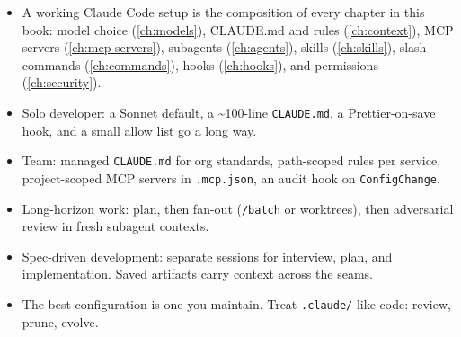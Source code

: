 \begin{summarybox}
\begin{itemize}
  \item A working Claude Code setup is the composition of every chapter
        in this book: model choice (\cref{ch:models}), CLAUDE.md and
        rules (\cref{ch:context}), MCP servers (\cref{ch:mcp-servers}),
        subagents (\cref{ch:agents}), skills (\cref{ch:skills}), slash
        commands (\cref{ch:commands}), hooks (\cref{ch:hooks}), and
        permissions (\cref{ch:security}).
  \item Solo developer: a Sonnet default, a \textasciitilde100-line
        \texttt{CLAUDE.md}, a Prettier-on-save hook, and a small allow
        list go a long way.
  \item Team: managed \texttt{CLAUDE.md} for org standards, path-scoped
        rules per service, project-scoped MCP servers in
        \texttt{.mcp.json}, an audit hook on \texttt{ConfigChange}.
  \item Long-horizon work: plan, then fan-out (\texttt{/batch} or
        worktrees), then adversarial review in fresh subagent contexts.
  \item Spec-driven development: separate sessions for interview, plan,
        and implementation. Saved artifacts carry context across the
        seams.
  \item The best configuration is one you maintain. Treat
        \texttt{.claude/} like code: review, prune, evolve.
\end{itemize}
\end{summarybox}

\nocite{*}
\printbibliography[heading=subbibliography,title={References}]
